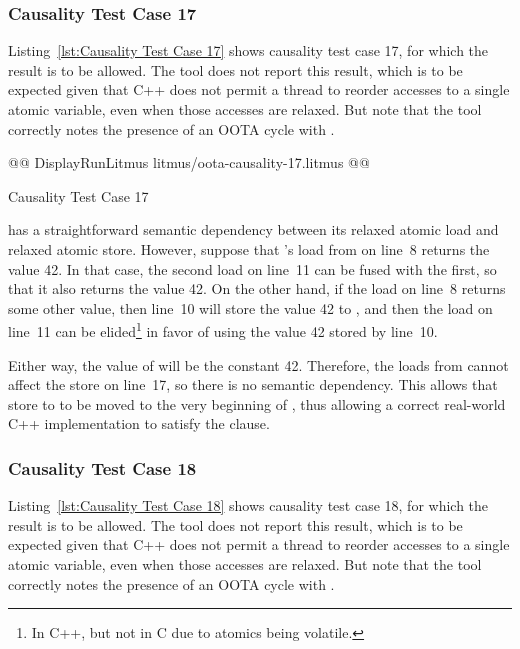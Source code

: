 \documentclass[10]{article}
\begin{document}
\subsubsection{Causality Test Case 17}
\label{app:Causality Test Case 17}

Listing~\ref{lst:Causality Test Case 17}
shows causality test case 17, for which the 
result is to be allowed.
The  tool does not report this result, which is to be expected
given that C++ does not permit a thread to reorder accesses to a single
atomic variable, even when those accesses are relaxed.
But note that the  tool correctly notes the presence of an
OOTA cycle with .

\begin{listing}[tbp]
@@ DisplayRunLitmus litmus/oota-causality-17.litmus @@
\caption{Causality Test Case 17}
\label{lst:Causality Test Case 17}
\end{listing}

 has a straightforward semantic dependency between its
relaxed atomic load and relaxed atomic store.
However, suppose that 's load from  on line~8 returns
the value 42.
In that case, the second load on line~11 can be fused with the first,
so that it also returns the value 42.
On the other hand, if the load on line~8 returns some other value, then
line~10 will store the value 42 to , and then the load on line~11
can be elided\footnote{
	In C++, but not in C due to atomics being volatile.}
in favor of using the value 42 stored by line~10.

Either way, the value of  will be the constant 42.
Therefore, the loads from  cannot affect the store on line~17,
so there is no semantic dependency.
This allows that store to  to be moved to the very beginning of
, thus allowing a correct real-world C++ implementation to
satisfy the  clause.

\subsubsection{Causality Test Case 18}
\label{app:Causality Test Case 18}

Listing~\ref{lst:Causality Test Case 18}
shows causality test case 18, for which the 
result is to be allowed.
The  tool does not report this result, which is to be expected
given that C++ does not permit a thread to reorder accesses to a single
atomic variable, even when those accesses are relaxed.
But note that the  tool correctly notes the presence of an
OOTA cycle with .
\end{document}
